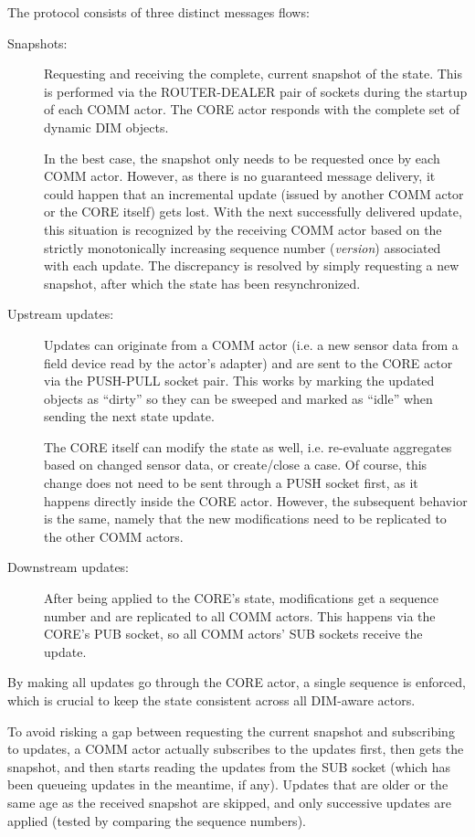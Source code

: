 The protocol consists of three distinct messages flows:

\begin{description}
	\item [Snapshots:]
		Requesting and receiving the complete, current snapshot of the
		state. This is performed via the ROUTER-DEALER pair of sockets
		during the startup of each COMM actor. The CORE actor responds
		with the complete set of dynamic DIM objects.

		In the best case, the snapshot only needs to be requested once
		by each COMM actor. However, as there is no guaranteed message
		delivery, it could happen that an incremental update (issued by
		another COMM actor or the CORE itself) gets lost. With the next
		successfully delivered update, this situation is recognized by
		the receiving COMM actor based on the strictly monotonically
		increasing sequence number (\emph{version}) associated with
		each update. The discrepancy is resolved by simply requesting a
		new snapshot, after which the state has been resynchronized.

	\item [Upstream updates:]
		Updates can originate from a COMM actor (i.e. a new sensor data
		from a field device read by the actor's adapter) and are sent to the
		CORE actor via the PUSH-PULL socket pair.  This works by
		marking the updated objects as ``dirty'' so they can be sweeped
		and marked as ``idle'' when sending the next state update.

		The CORE itself can modify the state as well, i.e. re-evaluate
		aggregates based on changed sensor data, or create/close a
		case. Of course, this change does not need to be sent through a
		PUSH socket first, as it happens directly inside the CORE
		actor. However, the subsequent behavior is the same, namely
		that the new modifications need to be replicated to the other
		COMM actors.

	\item [Downstream updates:]
		After being applied to the CORE's state,
		modifications get a sequence number and are replicated to all
		COMM actors. This happens via the CORE's PUB socket, so all
		COMM actors' SUB sockets receive the update.
\end{description}

By making all updates go through the CORE actor, a single sequence is enforced,
which is crucial to keep the state consistent across all DIM-aware actors.

To avoid risking a gap between requesting the current snapshot and subscribing
to updates, a COMM actor actually subscribes to the updates first, then gets the
snapshot, and then starts reading the updates from the SUB socket (which has been
queueing updates in the meantime, if any). Updates that are older or the same
age as the received snapshot are skipped, and only successive updates are
applied (tested by comparing the sequence numbers).

